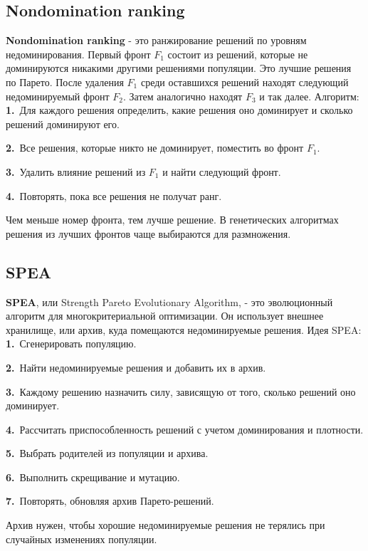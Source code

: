 \documentclass[12pt,a4paper]{article}
\begin{document}
\subsection{Nondomination ranking}
\textbf{Nondomination ranking} - это ранжирование решений по уровням недоминирования.
Первый фронт $F_1$ состоит из решений, которые не доминируются никакими другими решениями популяции. Это лучшие решения по Парето.
После удаления $F_1$ среди оставшихся решений находят следующий недоминируемый фронт $F_2$. Затем аналогично находят $F_3$ и так далее.
Алгоритм:
\noindent\textbf{1.}\ Для каждого решения определить, какие решения оно доминирует и сколько решений доминируют его.\par
\noindent\textbf{2.}\ Все решения, которые никто не доминирует, поместить во фронт $F_1$.\par
\noindent\textbf{3.}\ Удалить влияние решений из $F_1$ и найти следующий фронт.\par
\noindent\textbf{4.}\ Повторять, пока все решения не получат ранг.\par
Чем меньше номер фронта, тем лучше решение. В генетических алгоритмах решения из лучших фронтов чаще выбираются для размножения.
\subsection{SPEA}
\textbf{SPEA}, или Strength Pareto Evolutionary Algorithm, - это эволюционный алгоритм для многокритериальной оптимизации. Он использует внешнее хранилище, или архив, куда помещаются недоминируемые решения.
Идея SPEA:
\noindent\textbf{1.}\ Сгенерировать популяцию.\par
\noindent\textbf{2.}\ Найти недоминируемые решения и добавить их в архив.\par
\noindent\textbf{3.}\ Каждому решению назначить силу, зависящую от того, сколько решений оно доминирует.\par
\noindent\textbf{4.}\ Рассчитать приспособленность решений с учетом доминирования и плотности.\par
\noindent\textbf{5.}\ Выбрать родителей из популяции и архива.\par
\noindent\textbf{6.}\ Выполнить скрещивание и мутацию.\par
\noindent\textbf{7.}\ Повторять, обновляя архив Парето-решений.\par
Архив нужен, чтобы хорошие недоминируемые решения не терялись при случайных изменениях популяции.
\end{document}

